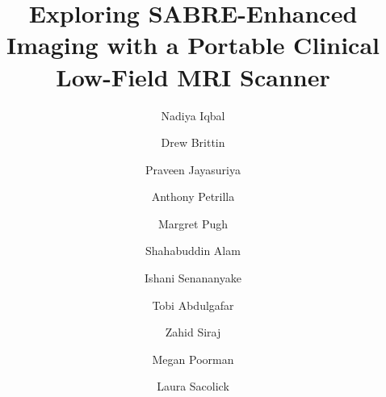 \documentclass[final,3p,times,twocolumn]{elsarticle}
\begin{document}
\begin{frontmatter}



\title{Exploring SABRE-Enhanced Imaging with a Portable Clinical Low-Field MRI Scanner}


\author[inst1]{Nadiya Iqbal}


\author[inst1]{Drew Brittin}
\author[inst1]{Praveen Jayasuriya}
\author[inst1]{Anthony Petrilla}
\author[inst1]{Margret Pugh}
\author[inst1]{Shahabuddin Alam}
\author[inst1]{Ishani Senananyake}
\author[inst1]{Tobi Abdulgafar}
\author[inst1]{Zahid Siraj}


\author[inst2]{Megan Poorman}
\author[inst2]{Laura Sacolick}


\end{frontmatter}
\end{document}
